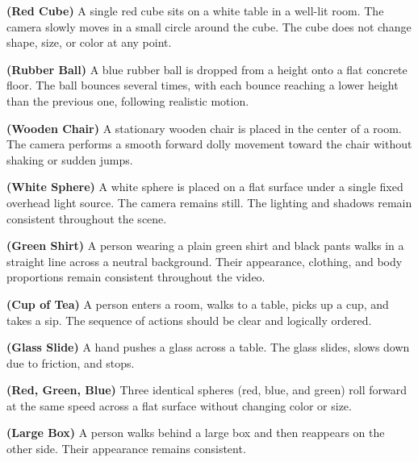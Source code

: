 \documentclass[sigconf]{acmart}
\begin{document}
\begin{enumerate}[label=\textbf{Prompt [\arabic*]}, leftmargin=*]

    \item \label{prompt:1}
          \textbf{(Red Cube)}
          A single red cube sits on a white table in a well-lit room. The camera slowly moves in a small circle around the cube. The cube does not change shape, size, or color at any point.

    \item \label{prompt:2}
          \textbf{(Rubber Ball)}
          A blue rubber ball is dropped from a height onto a flat concrete floor. The ball bounces several times, with each bounce reaching a lower height than the previous one, following realistic motion.

    \item \label{prompt:3}
          \textbf{(Wooden Chair)}
          A stationary wooden chair is placed in the center of a room. The camera performs a smooth forward dolly movement toward the chair without shaking or sudden jumps.

    \item \label{prompt:4}
          \textbf{(White Sphere)}
          A white sphere is placed on a flat surface under a single fixed overhead light source. The camera remains still. The lighting and shadows remain consistent throughout the scene.

    \item \label{prompt:5}
          \textbf{(Green Shirt)} A person wearing a plain green shirt and black pants walks in a straight line across a neutral background. Their appearance, clothing, and body proportions remain consistent throughout the video.

    \item \label{prompt:6}
          \textbf{(Cup of Tea)} A person enters a room, walks to a table, picks up a cup, and takes a sip. The sequence of actions should be clear and logically ordered.

    \item \label{prompt:7}
          \textbf{(Glass Slide)} A hand pushes a glass across a table. The glass slides, slows down due to friction, and stops.

    \item \label{prompt:8}
          \textbf{(Red, Green, Blue)} Three identical spheres (red, blue, and green) roll forward at the same speed across a flat surface without changing color or size.

    \item \label{prompt:9}
          \textbf{(Large Box)}  A person walks behind a large box and then reappears on the other side. Their appearance remains consistent.


\end{enumerate}
\end{document}
